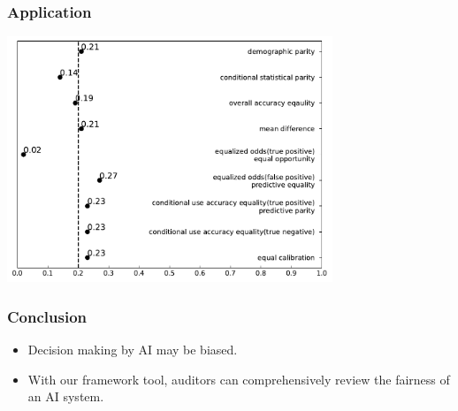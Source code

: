 \documentclass{beamer}
\begin{document}
\begin{frame}
    \frametitle{Application}
    \centering
    \includegraphics[width=0.73\textwidth]{Asian}
\end{frame}

\begin{frame}
    \frametitle{Conclusion}
    \begin{itemize}
        \item Decision making by AI may be biased.
        \item With our framework tool, auditors can comprehensively
        review the fairness of an AI system.
    \end{itemize}
\end{frame}
\end{document}
